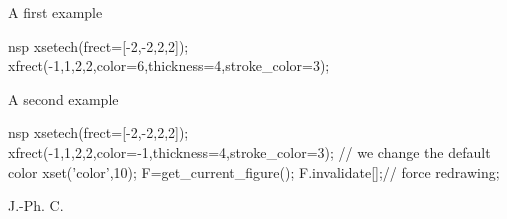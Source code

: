 \begin{examples}

A first example

  \begin{mintednsp}{nsp}
    xsetech(frect=[-2,-2,2,2]);
    xfrect(-1,1,2,2,color=6,thickness=4,stroke_color=3);
  \end{mintednsp}

A second example

  \begin{mintednsp}{nsp}
    xsetech(frect=[-2,-2,2,2]);
    xfrect(-1,1,2,2,color=-1,thickness=4,stroke_color=3);
    // we change the default color
    xset('color',10);
    F=get_current_figure();
    F.invalidate[];// force redrawing;
  \end{mintednsp}
\end{examples}
\begin{manseealso}
    
\end{manseealso}
\begin{authors}
  J.-Ph. C.  
\end{authors}

